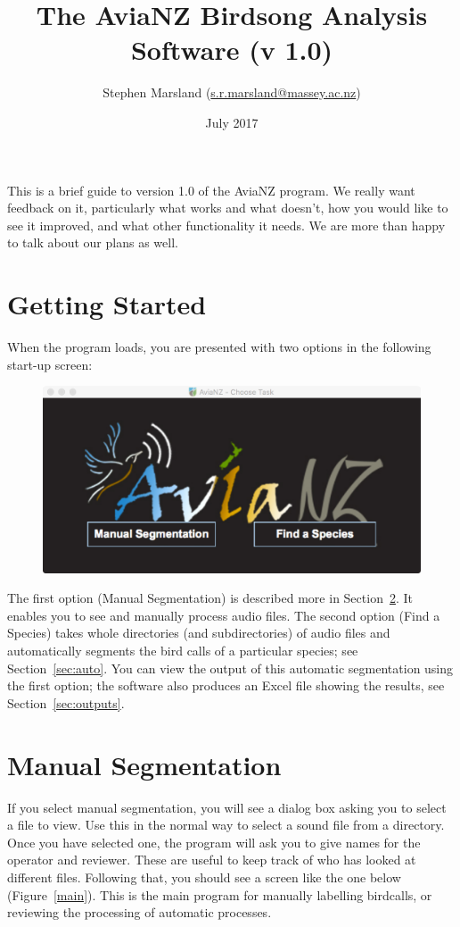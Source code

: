 \documentclass{article}
\title{The AviaNZ Birdsong Analysis Software (v 1.0)}
\author{Stephen Marsland (\url{s.r.marsland@massey.ac.nz})}
\date{July 2017}
\begin{document}
\maketitle



This is a brief guide to version 1.0 of the AviaNZ program. 
We really want feedback on it, particularly what works and what doesn't, how you would like to see it improved, and what other functionality it needs. We are more than happy to talk about our plans as well. 


\section{Getting Started}

When the program loads, you are presented with two options in the following start-up screen:

\begin{figure}[h!]
\centering
\includegraphics[width=.3\textwidth]{Figs/splashscreen}
\label{welcome}
\end{figure}

The first option (Manual Segmentation) is described more in Section~\ref{sec:manual}. It enables you to see and manually process audio files. The second option (Find a Species) takes whole directories (and subdirectories) of audio files and automatically segments the bird calls of a particular species; see Section~\ref{sec:auto}. You can view the output of this automatic segmentation using the first option; the software also produces an Excel file showing the results, see Section~\ref{sec:outputs}.  

\section{Manual Segmentation}
\label{sec:manual}

If you select manual segmentation, you will see a dialog box asking you to select a file to view. Use this in the normal way to select a sound file from a directory. Once you have selected one, the program will ask you to give names for the operator and reviewer. These are useful to keep track of who has looked at different files. Following that, you should see a screen like the one below (Figure~\ref{main}). This is the main program for manually labelling birdcalls, or reviewing the processing of automatic processes.
\end{document}
